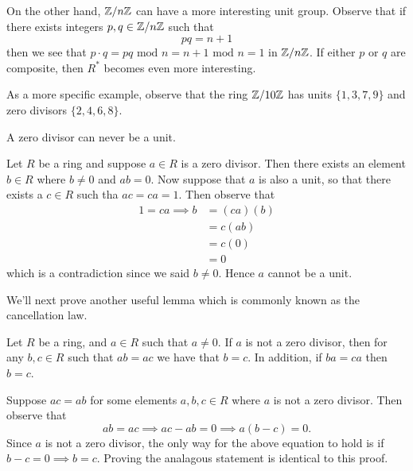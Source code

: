     On the other hand, $\mathbb{Z}/n\mathbb{Z}$ can have a more interesting unit group.
    Observe that if there exists integers $p, q \in \mathbb{Z}/n\mathbb{Z}$ such that 
    \[
        pq = n +1
    \]
    then we see that $p \cdot q = pq \mbox{ mod } n = n + 1
    \mbox{ mod } n = 1 $ in $\mathbb{Z}/n\mathbb{Z}$. If either $p$ or $q$ are composite,
    then $R^*$ becomes even more interesting.
    
    As a more specific example, observe that the ring $\mathbb{Z}/10\mathbb{Z}$
    has units $\{1, 3, 7, 9\}$ and zero divisors $\{2, 4, 6, 8\}$.

    \begin{lemma}
        A zero divisor can never be a unit.
    \end{lemma}

    \begin{prf}
        Let $R$ be a ring and suppose $a \in R$ is a zero divisor.
        Then there exists an element $b \in R$ where $b \ne 0$ and $ab = 0.$
        Now suppose that $a$ is also a unit, so that there exists
        a $c \in R$ such tha $ac = ca = 1$. Then observe that 
        \begin{align*}
            1 = ca \implies b &= (ca)(b)\\
            &= c(ab)\\
            &= c(0)\\
            & = 0
        \end{align*}
        which is a contradiction since we said $b \ne 0$. Hence
        $a$ cannot be a unit.
    \end{prf}

    We'll next prove another useful lemma which is commonly known
    as the cancellation law. 

    \begin{lemma}\label{lemma 2}
        Let $R$ be a ring, and $a \in R$ such that $a \ne 0$. If
        $a$ is not a zero divisor, then for any $b, c \in R$ such
        that $ab = ac$ we have that $b = c$. In addition, if $ba =
        ca$ then $b = c$.
    \end{lemma}

    \begin{prf}
        Suppose $ac = ab$ for some elements $a, b, c \in R$ where
        $a$ is not a zero divisor. Then observe that 
        \[
            ab = ac \implies ac - ab = 0 \implies a(b - c) = 0.
        \]
        Since $a$ is not a zero divisor, the only way for the
        above equation to hold is if $b - c = 0 \implies b = c$.
        Proving the analagous statement is identical to this
        proof. 
    \end{prf}

